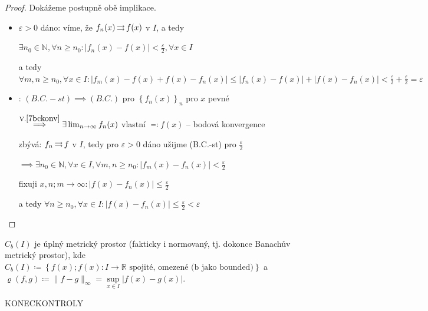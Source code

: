 \begin{proof}
    Dokážeme postupně obě implikace.
    \begin{itemize}
        \item[$1. \implies 2.$] $\varepsilon>0$ dáno: víme, že $f_n(x)\operatorname{\rightrightarrows} f(x)$ v $I$, a tedy

            $\exists n_0 \in \mathbb N, \forall n \geq n_0\colon\left|f_n(x)-f(x)\right|<\frac{\varepsilon}{2}, \forall x \in I$

            a tedy $\forall m,n \geq n_0, \forall x \in I\colon\left|f_m(x)-f(x)+f(x)-f_n(x)\right|\leq\left|f_n(x)-f(x)\right|+\left|f(x)-f_n(x)\right|<\frac{\varepsilon}{2}+\frac{\varepsilon}{2}=\varepsilon$
        \item[$2. \implies 1.$] \faEye: $(B.C.-st)\implies (B.C.)$ pro $\left\{f_n(x)\right\}_n$ pro $x$ pevné

            $\stackrel{\text{V.}\ref{7bckonv}}{\implies}\exists \lim_{n\to\infty} f_n(x)$ vlastní $\eqcolon f(x)$ -- bodová konvergence

            zbývá: $f_n\operatorname{\rightrightarrows} f$ v $I$, tedy pro $\varepsilon>0$ dáno užijme (B.C.-st) pro $\frac{\varepsilon}{2}$

            $\implies\exists n_0 \in \mathbb N, \forall x \in I, \forall m,n \geq n_0\colon\left|f_m(x)-f_n(x)\right|<\frac{\varepsilon}{2}$

            fixuji $x, n; m \to \infty\colon\left|f(x)-f_n(x)\right|\leq \frac{\varepsilon}{2}$

            a tedy $\forall n \geq n_0, \forall x \in I\colon\left|f(x)-f_n(x)\right|\leq \frac{\varepsilon}{2}<\varepsilon$
    \end{itemize}
\end{proof}

\begin{dusledek}
  $C_b(I)$ je úplný metrický prostor (fakticky i normovaný, tj. dokonce Banachův metrický prostor), kde $C_b(I) \coloneq \left\{f(x); f(x)\colon I \to \mathbb R\text{ spojité, omezené (b jako bounded)}\right\}$ a $\varrho(f,g) \coloneq \|f-g\|_\infty = \sup\limits_{x \in I} |f(x)-g(x)|$.
\end{dusledek}
KONECKONTROLY

